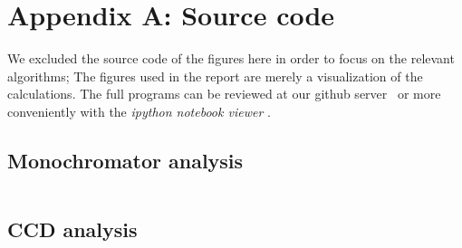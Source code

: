 \section{Appendix A: Source code}
We excluded the source code of the figures here in order to focus on the relevant algorithms; 
The figures used in the report are merely a visualization of the calculations. The full programs can
be reviewed at our github server~\cite{FPII_Z0} or more conveniently with the \textit{ipython notebook viewer} 
\cite{notebook_viewer}.
\subsection{Monochromator analysis}
\label{sub:mono_code}
\inputminted{python}{analysis/mono.py}    
\subsection{CCD analysis}
\label{sub:ccd_code}
\inputminted{python}{analysis/ccd.py}    
